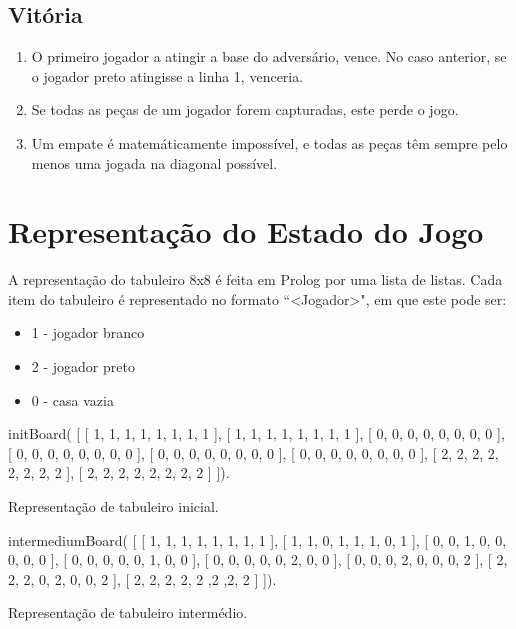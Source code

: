 \documentclass[15pt,a4paper]{article}
\begin{document}
\subsection{Vitória}
\begin{enumerate}
\item O primeiro jogador a atingir a base do adversário, vence. No caso anterior, se o jogador preto atingisse a linha 1, venceria.
\item Se todas as peças de um jogador forem capturadas, este perde o jogo.
\item Um empate é matemáticamente impossível, e todas as peças têm sempre pelo menos uma jogada na diagonal possível.
\end{enumerate}


 
\section{Representação do Estado do Jogo}

A representação do tabuleiro 8x8 é feita em Prolog por uma lista de listas.
Cada item do tabuleiro é representado no formato ``<Jogador>", em que este pode ser:
\begin{itemize}
\item 1 - jogador branco
\item 2 - jogador preto
\item 0 - casa vazia
\end{itemize}

\begin{code}[H]
	\begin{verbatimtab}
initBoard(
	[
		[ 1, 1, 1, 1, 1, 1, 1, 1 ],
		[ 1, 1, 1, 1, 1, 1, 1, 1 ],
		[ 0, 0, 0, 0, 0, 0, 0, 0 ],
		[ 0, 0, 0, 0, 0, 0, 0, 0 ],
		[ 0, 0, 0, 0, 0, 0, 0, 0 ],
		[ 0, 0, 0, 0, 0, 0, 0, 0 ],
		[ 2, 2, 2, 2, 2, 2, 2, 2 ],
		[ 2, 2, 2, 2, 2, 2, 2, 2 ]
	]).
\end{verbatimtab}
\caption{Representação de tabuleiro inicial.}
\end{code}


\begin{code}[H]
	\begin{verbatimtab}

intermediumBoard(
	[
		[ 1, 1, 1, 1, 1, 1, 1, 1 ],
		[ 1, 1, 0, 1, 1, 1, 0, 1 ],
		[ 0, 0, 1, 0, 0, 0, 0, 0 ],
		[ 0, 0, 0, 0, 0, 1, 0, 0 ],
		[ 0, 0, 0, 0, 0, 2, 0, 0 ],
		[ 0, 0, 0, 2, 0, 0, 0, 2 ],
		[ 2, 2, 2, 0, 2, 0, 0, 2 ],
		[ 2, 2, 2, 2, 2 ,2 ,2, 2 ]
	]).
\end{verbatimtab}
\caption{Representação de tabuleiro intermédio.}
\end{code}
\end{document}
